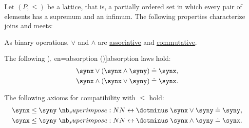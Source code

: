 \begin{proposition}\label{thm:lattice_operation_characterization}
  Let \( (P, \leq) \) be a \hyperref[def:lattice]{lattice}, that is, a partially ordered set in which every pair of elements has a supremum and an infimum. The following properties characterize joins and meets:

  \begin{thmenum}
     As binary operations, \( \vee \) and \( \wedge \) are \hyperref[def:binary_operation/associative]{associative} and \hyperref[def:binary_operation/commutative]{commutative}.

     The following \term[ru=(законы) поглощения (\cite[6]{Гуров2013ТеорияРешёток}), en=absorption (\cite[8]{Birkhoff1967LatticeTheory})]{absorption} laws hold:
    \begin{align}
      \synx \vee (\synx \wedge \syny) &\syneq \synx, \label{eq:thm:lattice_operation_characterization/absorption/join} \\
      \synx \wedge (\synx \vee \syny) &\syneq \synx. \label{eq:thm:lattice_operation_characterization/absorption/meet}
    \end{align}

     The following axioms for compatibility with \( \leq \) hold:
    \begin{align}
      \synx \leq \syny &\syniff \synx \vee \syny \syneq \syny, \label{eq:thm:lattice_operation_characterization/compatibility/join} \\
      \synx \leq \syny &\syniff \synx \wedge \syny \syneq \synx. \label{eq:thm:lattice_operation_characterization/compatibility/meet}
    \end{align}
  \end{thmenum}
\end{proposition}
